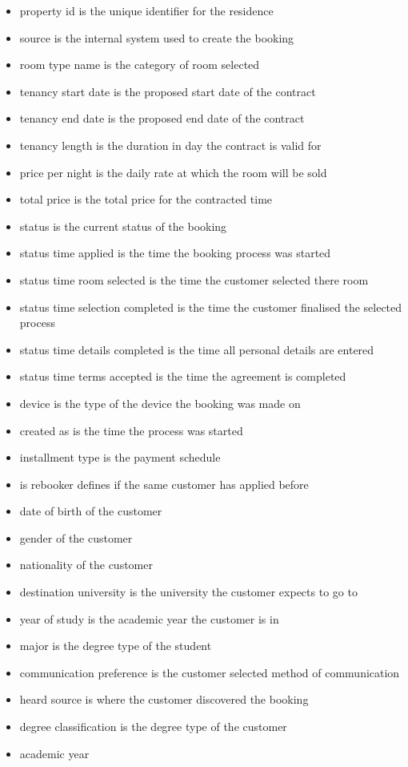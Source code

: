 \begin{itemize}
    \item property id is the unique identifier for the residence 
    \item source is the internal system used to create the booking
    \item room type name is the category of room selected
    \item tenancy start date is the proposed start date of the contract
    \item tenancy end date is the proposed end date of the contract
    \item tenancy length is the duration in day the contract is valid for
    \item price per night is the daily rate at which the room will be sold
    \item total price is the total price for the contracted time
    \item status is the current status of the booking
    \item status time applied is the time the booking process was started
    \item status time room selected is the time the customer selected there room
    \item status time selection completed is the time the customer finalised the selected process 
    \item status time details completed is the time all personal details are entered
    \item status time terms accepted is the time the agreement is completed
    \item device is the type of the device the booking was made on
    \item created as is the time the process was started
    \item installment type is the payment schedule
    \item is rebooker defines if the same customer has applied before
    \item date of birth of the customer
    \item gender of the customer
    \item nationality of the customer
    \item destination university is the university the customer expects to go to
    \item year of study is the academic year  the customer is in
    \item major is the degree type of the student
    \item communication preference is the customer selected method of communication
    \item heard source is where the customer discovered the booking
    \item degree classification is the degree type of the customer
    \item academic year
 

\end{itemize}

